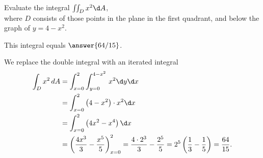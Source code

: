 \documentclass{ximera}
\author{Jim Fowler}
\begin{document}
\begin{exercise}
Evaluate the integral $\iint_D x^2 \d A$, \\
where $D$ consists of those points in the plane in the first quadrant,
and below the graph of $y = 4 - x^2$.

This integral equals $\answer{64/15}$.

\begin{hint}
 We replace the double integral with an iterated integral
     \begin{align*}
       \int_D x^2 \, dA
       &= \int_{x=0}^2 \int_{y = 0}^{4-x^2} \, x^2 \d y \d x \\
       &= \int_{x=0}^2 \left(4-x^2\right) \cdot x^2 \d x \\
       &= \int_{x=0}^2 \left(4x^2-x^4\right) \d x \\
       &= \left(\frac{4x^3}{3}-\frac{x^5}{5}\right)_{x=0}^{2} =
       \frac{4 \cdot 2^3}{3} - \frac{2^5}{5} = 2^5 \left( \frac{1}{3}
         - \frac{1}{5} \right) = \frac{64}{15}.
     \end{align*}
\end{hint}

\end{exercise}
\end{document}
